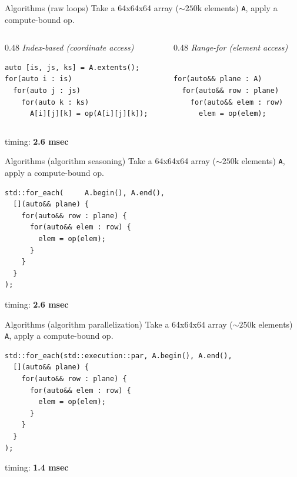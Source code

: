 \begin{frame}[fragile,label=alg1]{Algorithms (raw loops)}
  Take a 64x64x64 array ($\sim 250$k elements) \lstinline|A|, apply a compute-bound op.

\begin{columns}[t]
\begin{column}{0.48\textwidth}
\textit{Index-based (coordinate access)}
\begin{lstlisting}
auto [is, js, ks] = A.extents();
for(auto i : is)
  for(auto j : js)
    for(auto k : ks)
      A[i][j][k] = op(A[i][j][k]);
\end{lstlisting}
\end{column}
\begin{column}{0.48\textwidth}
\textit{Range-for (element access)}
\begin{lstlisting}

for(auto&& plane : A)
  for(auto&& row : plane)
    for(auto&& elem : row)
      elem = op(elem);
\end{lstlisting}
\end{column}
\end{columns}

  timing: \textbf{2.6 msec}
\end{frame}

\begin{frame}[fragile,label=alg2]{Algorithms (algorithm seasoning)}
  Take a 64x64x64 array (\(\sim 250\mathrm{k}\) elements) \lstinline|A|, apply a compute-bound op.
  \begin{lstlisting}
std::for_each(     A.begin(), A.end(),
  [](auto&& plane) {
    for(auto&& row : plane) {
      for(auto&& elem : row) {
        elem = op(elem);
      }
    }
  }
);
  \end{lstlisting}
  timing: \textbf{2.6 msec}
\end{frame}

\begin{frame}[fragile,label=alg3]{Algorithms (algorithm parallelization)}
  Take a 64x64x64 array (\(\sim 250\mathrm{k}\) elements) \lstinline|A|, apply a compute-bound op.
  \begin{lstlisting}
std::for_each(std::execution::par, A.begin(), A.end(),
  [](auto&& plane) {
    for(auto&& row : plane) {
      for(auto&& elem : row) {
        elem = op(elem);
      }
    }
  }
);
  \end{lstlisting}
  timing: \textbf{1.4 msec}
\end{frame}

